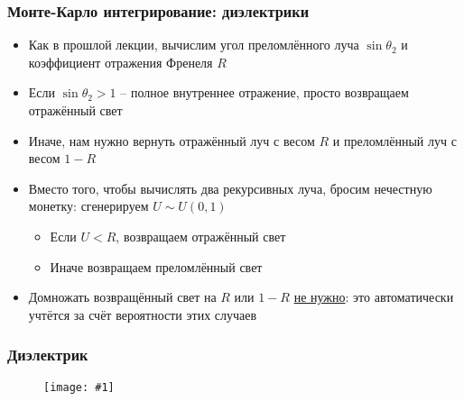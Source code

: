 \documentclass[handout,10pt]{beamer}
\newcommand{\slideimage}[1]{
  \begin{figure}
    \begin{adjustbox}{width=\textwidth, totalheight=\textheight-2\baselineskip-2\baselineskip,keepaspectratio}
      \texttt{[image: \#1]}
    \end{adjustbox}
  \end{figure}
}
\begin{document}
\begin{frame}[fragile]
\frametitle{Монте-Карло интегрирование: диэлектрики}
\begin{itemize}
\item Как в прошлой лекции, вычислим угол преломлённого луча \begin{math}\sin\theta_2\end{math} и коэффициент отражения Френеля \begin{math}R\end{math}
\pause
\item Если \begin{math}\sin\theta_2 > 1\end{math} -- полное внутреннее отражение, просто возвращаем отражённый свет
\pause
\item Иначе, нам нужно вернуть отражённый луч с весом \begin{math}R\end{math} и преломлённый луч с весом \begin{math}1-R\end{math}
\pause
\item Вместо того, чтобы вычислять два рекурсивных луча, бросим нечестную монетку: сгенерируем \begin{math}U \sim U(0,1)\end{math}
\pause
\begin{itemize}
\item Если \begin{math}U < R\end{math}, возвращаем отражённый свет
\pause
\item Иначе возвращаем преломлённый свет
\end{itemize}
\pause
\item Домножать возвращённый свет на \begin{math}R\end{math} или \begin{math}1-R\end{math} \underline{не нужно}: это автоматически учтётся за счёт вероятности этих случаев
\end{itemize}
\end{frame}

\begin{frame}[fragile]
\frametitle{Диэлектрик}
\slideimage{cool5.png}
\end{frame}
\end{document}
